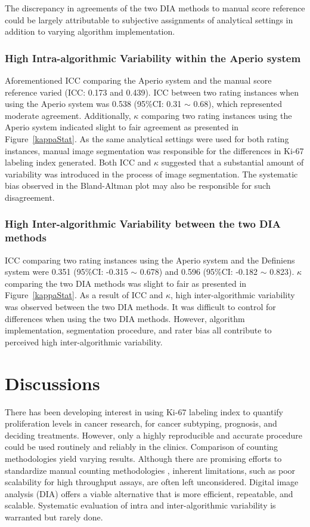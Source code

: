 \documentclass[final,5p,times,twocolumn]{elsarticle}
\begin{document}
The discrepancy in agreements of the two DIA methods to manual score reference could be largely attributable to subjective assignments of analytical settings in addition to varying algorithm implementation.


\subsubsection*{High Intra-algorithmic Variability within the Aperio system}
Aforementioned ICC comparing the Aperio system and the manual score reference varied (ICC: 0.173 and 0.439). ICC between two rating instances when using the Aperio system was 0.538 (95\%CI: 0.31 $\sim$ 0.68), which represented moderate agreement. Additionally, $\kappa$ comparing two rating instances using the Aperio system indicated slight to fair agreement as presented in Figure~\ref{kappaStat}. \cite{Landis1977} As the same analytical settings were used for both rating instances, manual image segmentation was responsible for the differences in Ki-67 labeling index generated. Both ICC and $\kappa$ suggested that a substantial amount of variability was introduced in the process of image segmentation. \cite{Cicchetti1994} The systematic bias observed in the Bland-Altman plot may also be responsible for such disagreement.

\subsubsection*{High Inter-algorithmic Variability between the two DIA methods}
ICC comparing two rating instances using the Aperio system and the Definiens system were 0.351 (95\%CI: -0.315 $\sim$ 0.678) and 0.596 (95\%CI: -0.182 $\sim$ 0.823). $\kappa$ comparing the two DIA methods was slight to fair as presented in Figure~\ref{kappaStat}. \cite{Landis1977} As a result of ICC and $\kappa$, high inter-algorithmic variability was observed between the two DIA methods. It was difficult to control for differences when using the two DIA methods. However, algorithm implementation, segmentation procedure, and rater bias all contribute to perceived high inter-algorithmic variability.



\section*{Discussions}

There has been developing interest in using Ki-67 labeling index to quantify proliferation levels in cancer research, for cancer subtyping, prognosis, and deciding treatments. However, only a highly reproducible and accurate procedure could be used routinely and reliably in the clinics. Comparison of counting methodologies yield varying results. \cite{Mikami2013, Reid2015} Although there are promising efforts to standardize manual counting methodologies \cite{Polley2013a, Polley2015}, inherent limitations, such as poor scalability for high throughput assays, are often left unconsidered. Digital image analysis (DIA) offers a viable alternative that is more efficient, repeatable, and scalable. Systematic evaluation of intra and inter-algorithmic variability is warranted but rarely done.
\end{document}
